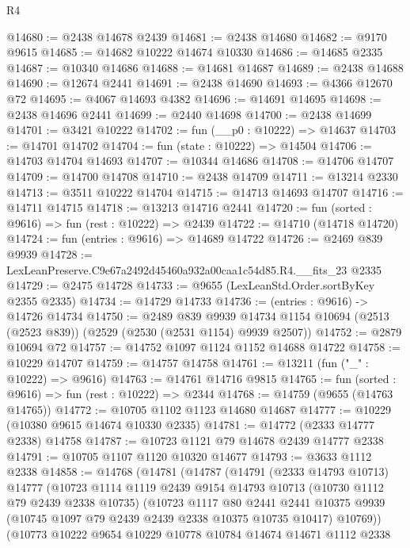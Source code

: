 \begin{lexlean}{R4}
\begin{coremodule}
@14680 := @2438 @14678 @2439
@14681 := @2438 @14680
@14682 := @9170 @9615
@14685 := @14682 @10222 @14674 @10330
@14686 := @14685 @2335
@14687 := @10340 @14686
@14688 := @14681 @14687
@14689 := @2438 @14688
@14690 := @12674 @2441
@14691 := @2438 @14690
@14693 := @4366 @12670 @72
@14695 := @4067 @14693 @4382
@14696 := @14691 @14695
@14698 := @2438 @14696 @2441
@14699 := @2440 @14698
@14700 := @2438 @14699
@14701 := @3421 @10222
@14702 := fun (__p0 : @10222) => @14637
@14703 := @14701 @14702
@14704 := fun (state : @10222) => @14504
@14706 := @14703 @14704 @14693
@14707 := @10344 @14686
@14708 := @14706 @14707
@14709 := @14700 @14708
@14710 := @2438 @14709
@14711 := @13214 @2330
@14713 := @3511 @10222 @14704
@14715 := @14713 @14693 @14707
@14716 := @14711 @14715
@14718 := @13213 @14716 @2441
@14720 := fun (sorted : @9616) => fun (rest : @10222) => @2439
@14722 := @14710 (@14718 @14720)
@14724 := fun (entries : @9616) => @14689 @14722
@14726 := @2469 @839 @9939
@14728 := LexLeanPreserve.C9e67a2492d45460a932a00caa1c54d85.R4.__fits_23 @2335
@14729 := @2475 @14728
@14733 := @9655 (LexLeanStd.Order.sortByKey @2355 @2335)
@14734 := @14729 @14733
@14736 := (entries : @9616) -> @14726 @14734
@14750 := @2489
    @839
    @9939
    @14734
    @1154
    @10694
    (@2513 (@2523 @839))
    (@2529 (@2530 (@2531 @1154) @9939 @2507))
@14752 := @2879 @10694 @72
@14757 := @14752 @1097 @1124 @1152 @14688 @14722
@14758 := @10229 @14707
@14759 := @14757 @14758
@14761 := @13211 (fun ("_" : @10222) => @9616)
@14763 := @14761 @14716 @9815
@14765 := fun (sorted : @9616) => fun (rest : @10222) => @2344
@14768 := @14759 (@9655 (@14763 @14765))
@14772 := @10705 @1102 @1123 @14680 @14687
@14777 := @10229 (@10380 @9615 @14674 @10330 @2335)
@14781 := @14772 (@2333 @14777 @2338) @14758
@14787 := @10723 @1121 @79 @14678 @2439 @14777 @2338
@14791 := @10705 @1107 @1120 @10320 @14677
@14793 := @3633 @1112 @2338
@14858 := @14768
    (@14781
      (@14787
        (@14791
          (@2333 @14793 @10713)
          @14777
          (@10723
            @1114
            @1119
            @2439
            @9154
            @14793
            @10713
            (@10730 @1112 @79 @2439 @2338 @10735)
            (@10723
              @1117
              @80
              @2441
              @2441
              @10375
              @9939
              (@10745 @1097 @79 @2439 @2439 @2338 @10375 @10735 @10417)
              @10769))
          (@10773
            @10222
            @9654
            @10229
            @10778
            @10784
            @14674
            @14671
            @1112
            @2338

\end{coremodule}
\end{lexlean}
